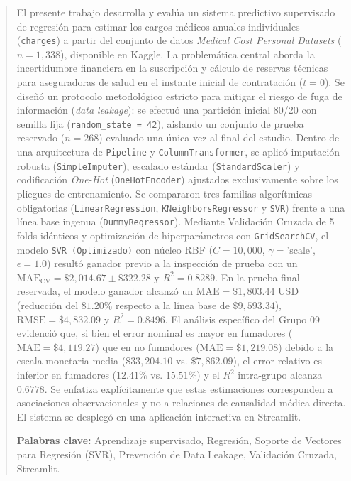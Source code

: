 \documentclass[11pt,a4paper]{article}
\begin{document}
\begin{abstract}
El presente trabajo desarrolla y evalúa un sistema predictivo supervisado de regresión para estimar los cargos médicos anuales individuales (\texttt{charges}) a partir del conjunto de datos \textit{Medical Cost Personal Datasets} ($n = 1,338$), disponible en Kaggle. La problemática central aborda la incertidumbre financiera en la suscripción y cálculo de reservas técnicas para aseguradoras de salud en el instante inicial de contratación ($t = 0$). Se diseñó un protocolo metodológico estricto para mitigar el riesgo de fuga de información (\textit{data leakage}): se efectuó una partición inicial 80/20 con semilla fija (\texttt{random\_state = 42}), aislando un conjunto de prueba reservado ($n = 268$) evaluado una única vez al final del estudio. Dentro de una arquitectura de \texttt{Pipeline} y \texttt{ColumnTransformer}, se aplicó imputación robusta (\texttt{SimpleImputer}), escalado estándar (\texttt{StandardScaler}) y codificación \textit{One-Hot} (\texttt{OneHotEncoder}) ajustados exclusivamente sobre los pliegues de entrenamiento. Se compararon tres familias algorítmicas obligatorias (\texttt{LinearRegression}, \texttt{KNeighborsRegressor} y \texttt{SVR}) frente a una línea base ingenua (\texttt{DummyRegressor}). Mediante Validación Cruzada de 5 folds idénticos y optimización de hiperparámetros con \texttt{GridSearchCV}, el modelo \texttt{SVR (Optimizado)} con núcleo RBF ($C = 10,000$, $\gamma = \text{'scale'}$, $\epsilon = 1.0$) resultó ganador previo a la inspección de prueba con un $\text{MAE}_{\text{CV}} = \$2,014.67 \pm \$322.28$ y $R^2 = 0.8289$. En la prueba final reservada, el modelo ganador alcanzó un $\text{MAE} = \$1,803.44$ USD (reducción del $81.20\%$ respecto a la línea base de $\$9,593.34$), $\text{RMSE} = \$4,832.09$ y $R^2 = 0.8496$. El análisis específico del Grupo 09 evidenció que, si bien el error nominal es mayor en fumadores ($\text{MAE} = \$4,119.27$) que en no fumadores ($\text{MAE} = \$1,219.08$) debido a la escala monetaria media ($\$33,204.10$ vs. $\$7,862.09$), el error relativo es inferior en fumadores ($12.41\%$ vs. $15.51\%$) y el $R^2$ intra-grupo alcanza $0.6778$. Se enfatiza explícitamente que estas estimaciones corresponden a asociaciones observacionales y no a relaciones de causalidad médica directa. El sistema se desplegó en una aplicación interactiva en Streamlit.
\par\vspace{0.3cm}
\noindent\textbf{Palabras clave:} Aprendizaje supervisado, Regresión, Soporte de Vectores para Regresión (SVR), Prevención de Data Leakage, Validación Cruzada, Streamlit.
\end{abstract}
\end{document}
